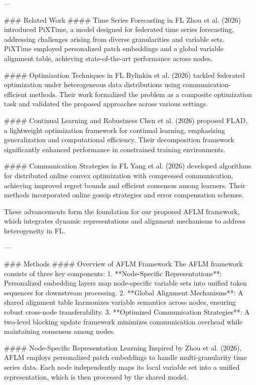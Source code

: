 ---

### Related Work
#### Time Series Forecasting in FL
Zhou et al. (2026) introduced PiXTime, a model designed for federated time series forecasting, addressing challenges arising from diverse granularities and variable sets. PiXTime employed personalized patch embeddings and a global variable alignment table, achieving state-of-the-art performance across nodes.

#### Optimization Techniques in FL
Bylinkin et al. (2026) tackled federated optimization under heterogeneous data distributions using communication-efficient methods. Their work formalized the problem as a composite optimization task and validated the proposed approaches across various settings.

#### Continual Learning and Robustness
Chen et al. (2026) proposed FLAD, a lightweight optimization framework for continual learning, emphasizing generalization and computational efficiency. Their decomposition framework significantly enhanced performance in constrained training environments.

#### Communication Strategies in FL
Yang et al. (2026) developed algorithms for distributed online convex optimization with compressed communication, achieving improved regret bounds and efficient consensus among learners. Their methods incorporated online gossip strategies and error compensation schemes.

These advancements form the foundation for our proposed AFLM framework, which integrates dynamic representations and alignment mechanisms to address heterogeneity in FL.

---

### Methods
#### Overview of AFLM Framework
The AFLM framework consists of three key components:
1. **Node-Specific Representations**: Personalized embedding layers map node-specific variable sets into unified token sequences for downstream processing.
2. **Global Alignment Mechanisms**: A shared alignment table harmonizes variable semantics across nodes, ensuring robust cross-node transferability.
3. **Optimized Communication Strategies**: A two-level blocking update framework minimizes communication overhead while maintaining consensus among nodes.

#### Node-Specific Representation Learning
Inspired by Zhou et al. (2026), AFLM employs personalized patch embeddings to handle multi-granularity time series data. Each node independently maps its local variable set into a unified representation, which is then processed by the shared model.

